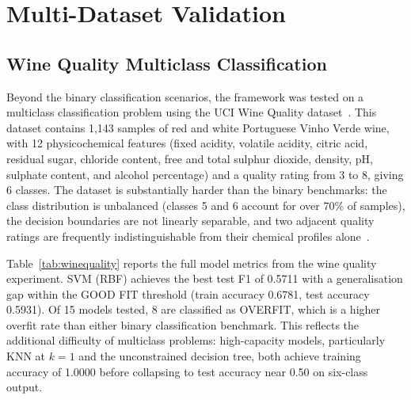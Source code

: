 \documentclass[conference]{IEEEtran}
\begin{document}
\section{Multi-Dataset Validation}

\subsection{Wine Quality Multiclass Classification}

Beyond the binary classification scenarios, the framework was tested on a multiclass classification problem using the UCI Wine Quality dataset~\cite{b37}. This dataset contains 1,143 samples of red and white Portuguese Vinho Verde wine, with 12 physicochemical features (fixed acidity, volatile acidity, citric acid, residual sugar, chloride content, free and total sulphur dioxide, density, pH, sulphate content, and alcohol percentage) and a quality rating from 3 to 8, giving 6 classes. The dataset is substantially harder than the binary benchmarks: the class distribution is unbalanced (classes 5 and 6 account for over 70\% of samples), the decision boundaries are not linearly separable, and two adjacent quality ratings are frequently indistinguishable from their chemical profiles alone~\cite{b38}.

Table~\ref{tab:winequality} reports the full model metrics from the wine quality experiment. SVM (RBF) achieves the best test F1 of 0.5711 with a generalisation gap within the GOOD FIT threshold (train accuracy 0.6781, test accuracy 0.5931). Of 15 models tested, 8 are classified as OVERFIT, which is a higher overfit rate than either binary classification benchmark. This reflects the additional difficulty of multiclass problems: high-capacity models, particularly KNN at $k=1$ and the unconstrained decision tree, both achieve training accuracy of 1.0000 before collapsing to test accuracy near 0.50 on six-class output.
\end{document}
